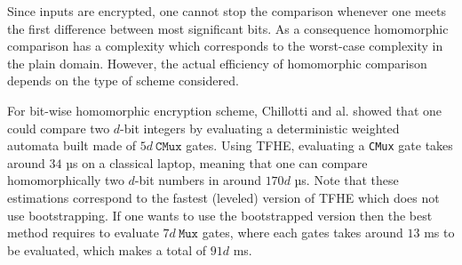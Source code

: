 Since inputs are encrypted, one cannot stop the comparison whenever one meets the first difference between most significant bits. As a consequence homomorphic comparison has a complexity which corresponds to the worst-case complexity in the plain domain. However, the actual efficiency of homomorphic comparison depends on the type of scheme considered.

For bit-wise homomorphic encryption scheme, Chillotti and al. showed that one could compare two $d$-bit integers by evaluating a deterministic weighted automata built made of $5d~\texttt{CMux}$ gates. Using TFHE, evaluating a \texttt{CMux} gate takes around $34$ µs on a classical laptop, meaning that one can compare homomorphically two $d$-bit numbers in around $170d$ µs. Note that these estimations correspond to the fastest (leveled) version of TFHE which does not use bootstrapping. If one wants to use the bootstrapped version then the best method requires to evaluate $7d~\texttt{Mux}$ gates, where each gates takes around $13$ ms to be evaluated, which makes a total of $91d$ ms.

